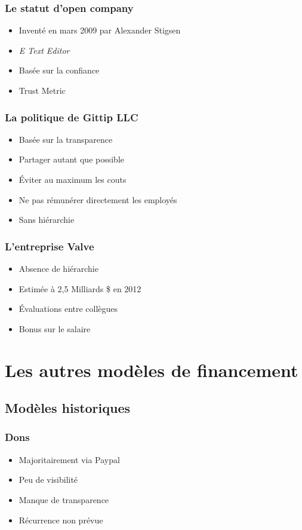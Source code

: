 \begin{frame}
\frametitle{Le statut d'open company}

\begin{itemize}
    \itemsep1.5em
    \item Inventé en mars 2009 par Alexander Stigsen
    \item \emph{E Text Editor}
    \item Basée sur la confiance
    \item Trust Metric
\end{itemize}
\end{frame}


\begin{frame}
\frametitle{La politique de Gittip LLC}

\begin{itemize}
    \itemsep1.5em
    \item Basée sur la transparence
    \item Partager autant que possible
    \item Éviter au maximum les couts
    \item Ne pas rémunérer directement les employés
    \item Sans hiérarchie
\end{itemize}
\end{frame}


\begin{frame}
\frametitle{L'entreprise Valve}

\begin{itemize}
    \itemsep1.5em
    \item Absence de hiérarchie
    \item Estimée à 2,5 Milliards \${} en 2012
    \item Évaluations entre collègues
    \item Bonus sur le salaire
\end{itemize}
\end{frame}


    \section{Les autres modèles de financement}

    \subsection{Modèles historiques}

\begin{frame}
\frametitle{Dons}

\begin{itemize}
    \itemsep1.5em
    \item Majoritairement via Paypal
    \item Peu de visibilité
    \item Manque de transparence
    \item Récurrence non prévue
\end{itemize}
\end{frame}


